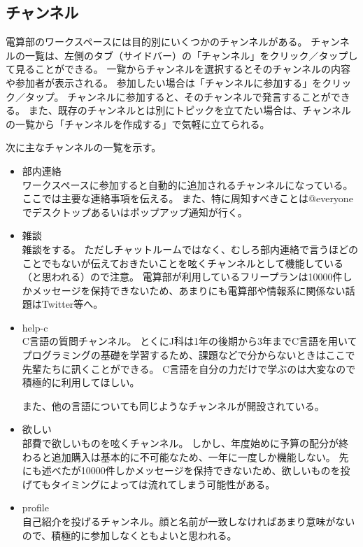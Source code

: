 \documentclass[lualatex,ja=standard,12pt,a4j]{bxjsbook}
\begin{document}
            \subsection{チャンネル\label{channel}}
            	電算部のワークスペースには目的別にいくつかのチャンネルがある。
            	チャンネルの一覧は、左側のタブ（サイドバー）の「チャンネル」をクリック／タップして見ることができる。
            	一覧からチャンネルを選択するとそのチャンネルの内容や参加者が表示される。
            	参加したい場合は「チャンネルに参加する」をクリック／タップ。
            	チャンネルに参加すると、そのチャンネルで発言することができる。
            	また、既存のチャンネルとは別にトピックを立てたい場合は、チャンネルの一覧から「チャンネルを作成する」で気軽に立てられる。
            
            	次に主なチャンネルの一覧を示す。
            
            	\begin{itemize}
            		\item 部内連絡\\
                        ワークスペースに参加すると自動的に追加されるチャンネルになっている。
                        ここでは主要な連絡事項を伝える。
                        また、特に周知すべきことは@everyoneでデスクトップあるいはポップアップ通知が行く。
                	\item 雑談\\
                    	雑談をする。
                        ただしチャットルームではなく、むしろ部内連絡で言うほどのことでもないが伝えておきたいことを呟くチャンネルとして機能している（と思われる）ので注意。
                        電算部が利用しているフリープランは10000件しかメッセージを保持できないため、あまりにも電算部や情報系に関係ない話題はTwitter等へ。
                    \item help-c\\
                    	C言語の質問チャンネル。
                        とくにJ科は1年の後期から3年までC言語を用いてプログラミングの基礎を学習するため、課題などで分からないときはここで先輩たちに訊くことができる。
                        C言語を自分の力だけで学ぶのは大変なので積極的に利用してほしい。
                        
                        また、他の言語についても同じようなチャンネルが開設されている。
                    \item 欲しい\\
                    	部費で欲しいものを呟くチャンネル。
                        しかし、年度始めに予算の配分が終わると追加購入は基本的に不可能なため、一年に一度しか機能しない。
                        先にも述べたが10000件しかメッセージを保持できないため、欲しいものを投げてもタイミングによっては流れてしまう可能性がある。
                    \item profile\\
                    	自己紹介を投げるチャンネル。顔と名前が一致しなければあまり意味がないので、積極的に参加しなくともよいと思われる。
            	\end{itemize}
            
\end{document}
